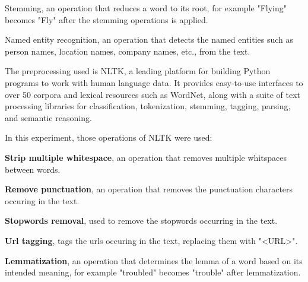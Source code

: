 \documentclass[12pt, a4paper]{article}
\begin{document}
Stemming, an operation that reduces a word to its root, for example "Flying" becomes "Fly" after the stemming operations is applied.


Named entity recognition, an operation that detects the named entities such as person names, location names, company names, etc., from the text.
\hfill\break





The preprocessing used is NLTK, a leading platform for building Python programs to work with human language data.
It provides easy-to-use interfaces to over 50 corpora and lexical resources such as WordNet,
along with a suite of text processing libraries for classification, tokenization, stemming, tagging, parsing,
and semantic reasoning.


\hfill\break
In this experiment, those operations of NLTK were used:

\textbf{Strip multiple whitespace}, an operation that removes multiple whitspaces between words.


\textbf{Remove punctuation}, an operation that removes the punctuation characters occuring in the text.


\textbf{Stopwords removal}, used to remove the stopwords occurring in the text.


\textbf{Url tagging}, tags the urls occuring in the text, replacing them with "<URL>".


\textbf{Lemmatization}, an operation that determines the lemma of a word based on its intended meaning, for example "troubled" becomes "trouble" after lemmatization.
\end{document}
